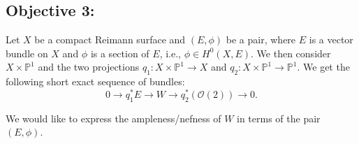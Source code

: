 \documentclass[11pt,reqno,a4paper]{amsart}
\theoremstyle{remark}
\begin{document}
\subsection*{Objective 3:}
Let $X$ be a compact Reimann surface and $(E, \phi)$ be a pair, where $E$ is a vector bundle on $X$ and $\phi$ is a 
section of $E$, i.e., $\phi \in H^0(X, E)$. We then consider $X \times \mathbb{P}^1$ and the two projections $q_1 : X \times \mathbb{P}^1 \longrightarrow X$ and $q_2 : X \times \mathbb{P}^1 \longrightarrow 
\mathbb{P}^1$.  We get the following short exact sequence of bundles:
\[
0 \longrightarrow q_1^*E \longrightarrow W \longrightarrow q_2^*(\mathcal{O}(2)) \longrightarrow 0.
\] 

We would like to express the ampleness/nefness of $W$ in terms of the pair $(E, \phi)$.
\end{document}
